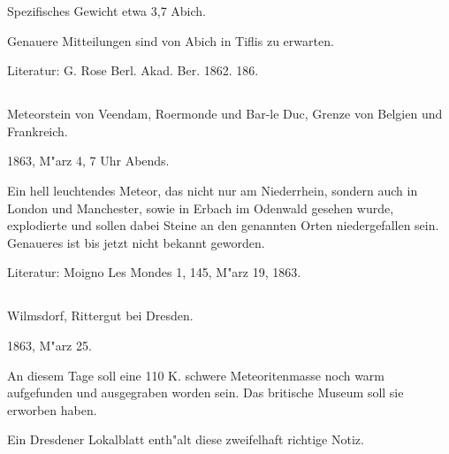 \documentclass[a4paper, 11pt, oneside]{article}
\begin{document}
Spezifisches Gewicht etwa 3,7 Abich.

Genauere Mitteilungen sind von Abich in Tiflis zu erwarten.

\normalsize
Literatur: G. Rose Berl. Akad. Ber. 1862. 186.

\subsection{}
\LARGE
\paragraph{}
Meteorstein von Veendam, Roermonde und Bar-le Duc, Grenze von Belgien und Frankreich.

1863, M"arz 4, 7 Uhr Abends.

Ein hell leuchtendes Meteor, das nicht nur am Niederrhein, sondern auch in London und Manchester, sowie in Erbach im Odenwald gesehen wurde, explodierte und sollen dabei Steine an den genannten Orten niedergefallen sein. Genaueres ist bis jetzt nicht bekannt geworden.

\normalsize
Literatur: Moigno Les Mondes 1, 145, M"arz 19, 1863.

\subsection{}
\LARGE
\paragraph{}
Wilmsdorf, Rittergut bei Dresden.

1863, M"arz 25.

An diesem Tage soll eine 110 K. schwere Meteoritenmasse noch warm aufgefunden und ausgegraben worden sein. Das britische Museum soll sie erworben haben.

Ein Dresdener Lokalblatt enth"alt diese zweifelhaft richtige Notiz.
\clearpage
\end{document}
